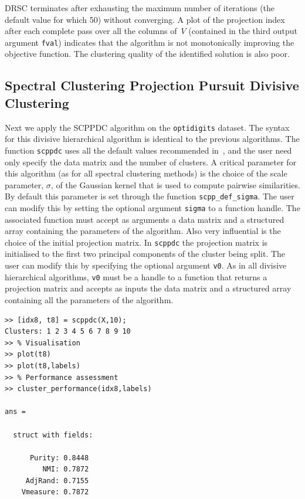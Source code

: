 \documentclass{book}
\begin{document}
\noindent
%
DRSC terminates after exhausting the maximum number of iterations (the default
value for which 50) without converging. A plot of the projection index after
each complete pass over all the columns of~$V$ (contained in the third
output argument {\tt fval}) indicates that the algorithm is not monotonically
improving the objective function.
%
The clustering quality of the identified solution is also poor.


\subsection{Spectral Clustering Projection Pursuit Divisive Clustering}

Next we apply the SCPPDC algorithm on the {\tt optidigits} dataset. The syntax
for this divisive hierarchical algorithm is identical to the previous
algorithms. The function {\tt scppdc} uses all the default values recommended
in~\cite{HofmeyrPE2018}, and the user need only specify the data matrix and the
number of clusters. 
%
A critical parameter for this algorithm (as for all
spectral clustering methods) is the choice of the scale parameter, $\sigma$, of
the Gaussian kernel that is used to compute pairwise similarities.
%
By default this parameter is set through the function {\tt scpp\_def\_sigma}.
The user can modify this by setting the optional argument {\tt sigma}
to a function handle. The associated function must accept as
arguments a data matrix and a structured array containing the parameters
of the algorithm.
%
Also very influential is the choice of the initial projection matrix.
In {\tt scppdc} the projection matrix is initialised to the first two principal
components of the cluster being split. 
The user can modify this by specifying the optional
argument {\tt v0}. As in all divisive hierarchical algorithms, {\tt v0} must
be a handle to a
function that returns a projection matrix and accepts as inputs
the data matrix and a structured array containing all the parameters
of the algorithm.

\begin{verbatim}
>> [idx8, t8] = scppdc(X,10);
Clusters: 1 2 3 4 5 6 7 8 9 10
>> % Visualisation
>> plot(t8)
>> plot(t8,labels)
>> % Performance assessment
>> cluster_performance(idx8,labels)

ans = 

  struct with fields:

      Purity: 0.8448
         NMI: 0.7872
     AdjRand: 0.7155
    Vmeasure: 0.7872

\end{verbatim}
\end{document}
